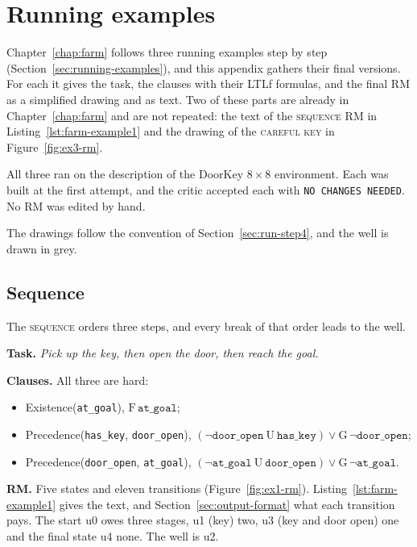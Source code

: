 \documentclass[11pt,english,listoffigures,listoftables]{tfgetsinf}
\newcommand{\runex}[1]{\textsc{#1}}  %
\begin{document}

\chapter{Running examples}
\label{app:running}
Chapter~\ref{chap:farm} follows three running examples step by step (Section~\ref{sec:running-examples}), and this appendix gathers their final versions. For each it gives the task, the clauses with their LTLf formulas, and the final RM as a simplified drawing and as text. Two of these parts are already in Chapter~\ref{chap:farm} and are not repeated: the text of the \runex{sequence} RM in Listing~\ref{lst:farm-example1} and the drawing of the \runex{careful key} in Figure~\ref{fig:ex3-rm}.

All three ran on the description of the DoorKey $8 \times 8$ environment. Each was built at the first attempt, and the critic accepted each with \texttt{NO CHANGES NEEDED}. No RM was edited by hand.

The drawings follow the convention of Section~\ref{sec:run-step4}, and the well is drawn in grey.

\section{Sequence}
The \runex{sequence} orders three steps, and every break of that order leads to the well.

\textbf{Task.} \textit{Pick up the key, then open the door, then reach the goal.}

\textbf{Clauses.} All three are hard:
\begin{itemize}
    \item Existence(\texttt{at\_goal}), $\mathrm{F}\,\texttt{at\_goal}$;
    \item Precedence(\texttt{has\_key}, \texttt{door\_open}), $(\neg\texttt{door\_open}\ \mathrm{U}\ \texttt{has\_key}) \lor \mathrm{G}\,\neg\texttt{door\_open}$;
    \item Precedence(\texttt{door\_open}, \texttt{at\_goal}), $(\neg\texttt{at\_goal}\ \mathrm{U}\ \texttt{door\_open}) \lor \mathrm{G}\,\neg\texttt{at\_goal}$.
\end{itemize}

\textbf{RM.} Five states and eleven transitions (Figure~\ref{fig:ex1-rm}). Listing~\ref{lst:farm-example1} gives the text, and Section~\ref{sec:output-format} what each transition pays. The start u0 owes three stages, u1 (key) two, u3 (key and door open) one and the final state u4 none. The well is u2.
\end{document}
